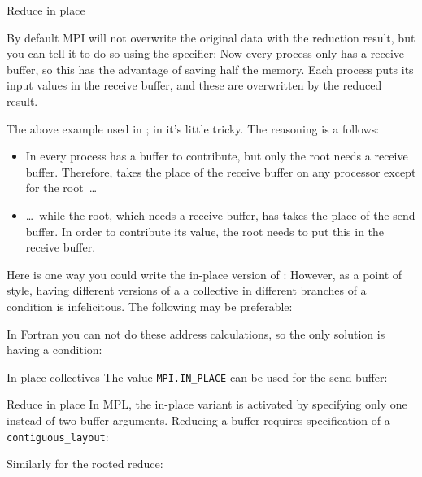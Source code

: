  {Reduce in place}
\label{sec:allreduce-inplace}

By default MPI will not overwrite the original data with the reduction
result, but you can tell it to do so
using the  specifier:
%
%
Now every process only has a receive buffer, so this
has the advantage of saving half the memory.
Each process puts its input values in the receive buffer,
and these are overwritten by the reduced result.

The above example used  in
;
in  it's little  tricky.
The reasoning is a follows:
\begin{itemize}
\item In  every process has a buffer to
  contribute, but only the root needs a receive buffer. Therefore,
   takes the place of the receive buffer
  on any processor except for the root~\ldots
\item \dots~while the root, which needs a receive buffer,
  has  takes the place of the send buffer.
  In order to contribute its value, the root needs to put this in the
  receive buffer.
\end{itemize}

Here is one way you could write the in-place version of :
%
%
However, as a point of style, having different versions of a a collective
in different branches of a condition is infelicitous. The following may be preferable:
%

In Fortran  you can not do these address calculations,
so the only solution is having a condition:
%

\begin{pythonnote}{In-place collectives}
  The value \lstinline+MPI.IN_PLACE+ can be used for the send buffer:
\end{pythonnote}

\begin{mplnote}{Reduce in place}
  In \ac{MPL}, the in-place variant is activated by
  specifying only one instead of two buffer arguments.
  Reducing a buffer requires specification of a \lstinline+contiguous_layout+:

  Similarly for the rooted reduce:
\end{mplnote}

